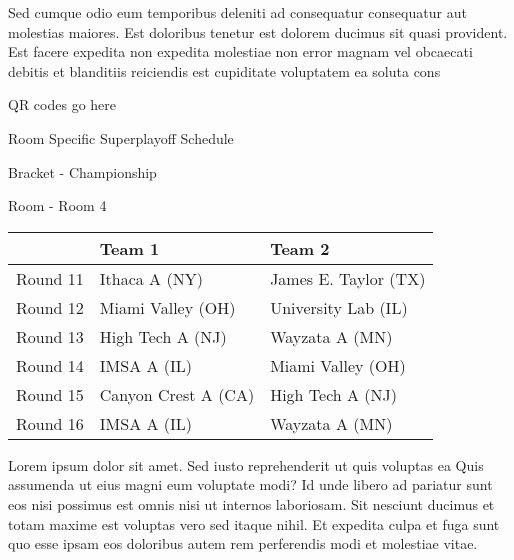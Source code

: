 \documentclass{article}%
\begin{document}
\newline%
    Sed cumque odio eum temporibus deleniti ad consequatur consequatur aut molestias maiores. Est doloribus tenetur est dolorem ducimus sit quasi provident. Est facere expedita non expedita molestiae non error magnam vel obcaecati debitis et blanditiis reiciendis est cupiditate voluptatem ea soluta cons%
\vspace*{140pt}%
\begin{center}%
\begin{Huge}%
QR codes go here%
\end{Huge}%
\end{center}%
\newpage%
\begin{center}%
\begin{Huge}%
Room Specific Superplayoff Schedule%
\end{Huge}%
\vspace*{8pt}%
\linebreak%
\begin{Large}%
Bracket {-} Championship%
\end{Large}%
\vspace*{8pt}%
\linebreak%
\vspace*{8pt}%
\begin{Large}%
Room {-} Room 4%
\end{Large}%
\end{center}%
%
\begin{tabularx}{\textwidth}{|c|Y|Y|}%
\hline%
&Team 1&Team 2\\%
\hline%
Round 11&Ithaca A (NY)&James E. Taylor (TX)\\%
Round 12&Miami Valley (OH)&University Lab (IL)\\%
Round 13&High Tech A (NJ)&Wayzata A (MN)\\%
Round 14&IMSA A (IL)&Miami Valley (OH)\\%
Round 15&Canyon Crest A (CA)&High Tech A (NJ)\\%
Round 16&IMSA A (IL)&Wayzata A (MN)\\%
\hline%
\end{tabularx}%
\vspace*{8pt}%
\newline%
    Lorem ipsum dolor sit amet. Sed iusto reprehenderit ut quis voluptas ea Quis assumenda ut eius magni eum voluptate modi? Id unde libero ad pariatur sunt eos nisi possimus est omnis nisi ut internos laboriosam. Sit nesciunt ducimus et totam maxime est voluptas vero sed itaque nihil. Et expedita culpa et fuga sunt quo esse ipsam eos doloribus autem rem perferendis modi et molestiae vitae.\newline%
\end{document}
